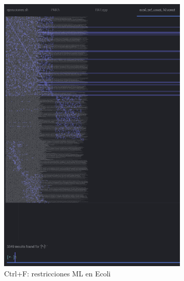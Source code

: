 \documentclass[12pt, spanish]{article}
\begin{document}
\begin{figure}[H]
  \centering
  \begin{subfigure}[b]{0.55\textwidth}
     \hspace{1.2cm} \includegraphics[scale = 0.28]{rest_ecoli_10.png}
 		 \caption{Ctrl+F: restricciones ML en Ecoli}
  		\label{fig:rest_ecoli_10_1}
  \end{subfigure}
  \hfill
  \begin{subfigure}[b]{0.40\textwidth}

\end{subfigure}
\end{figure}
\end{document}
